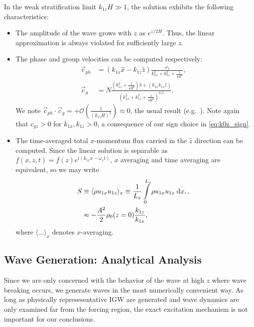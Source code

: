 \documentclass[
        fleqn,
        usenatbib,
    ]{mnras}
\newcommand*{\ev}[1]{\langle#1\rangle}
\newcommand*{\p}[1]{\left(#1\right)}
\begin{document}
In the weak stratification limit $k_{1z}H \gg 1$, the solution exhibits the
following characteristics:
\begin{itemize}
    \item The amplitude of the wave grows with $z$ as $e^{z/2H}$. Thus, the
        linear approximation is always violated for sufficiently large $z$.

    \item The phase and group velocities can be computed respectively:
        \begin{align}
            \vec{c}_{ph} &=
                \p{k_{1x}\hat{x} - k_{1z}\hat{z}}\frac{\omega_1}
                {k_{1x}^2 + k_{1z}^2 + \frac{1}{4H^2}},\\
            \vec{c}_{g} &= N\frac{\p{k_{1z}^2 + \frac{1}{4H^2}}\hat{x}
                + \p{k_{1x}k_{1z}\hat{z}}}
                {\p{k_{1x}^2 + k_{1z}^2 + \frac{1}{4H^2}}^{3/2}}.\label{eq:vg}
        \end{align}
        We note $\vec{c}_{ph} \cdot \vec{c}_g = +
        \mathcal{O}\p{\frac{1}{\p{k_{1z}H}^{2}}} \approx 0$, the usual result
        (e.g.\  \citep{drazin,sutherland1}). Note again that $c_{gz} > 0$ for
        $k_{1x}, k_{1z} > 0$, a consequence of our sign choice in
        \autoref{eq:k0z_sign}.

    \item The time-averaged total $x$-momentum flux carried in the $\hat{z}$
        direction can be computed. Since the linear solution is separable as
        $f(x, z, t) = f(z)e^{i(k_{1x}x - \omega_1 t)}$, $x$ averaging and time
        averaging are equivalent, so we may write
        \begin{align}
            S &\equiv \ev{\rho u_{1x} u_{1z}}_x \equiv
                \frac{1}{L_x}\int_0^{L_x}\limits \rho u_{1x} u_{1z}\;\mathrm{d}x,
                    \label{eq:S_def},\\
                &\approx -\frac{A^2}{2}\rho_0(z=0)\frac{k_{1z}}{k_{1x}},
                    \label{eq:S_lin}
        \end{align}
        where $\ev{\dots}_x$ denotes $x$-averaging.
\end{itemize}

\subsection{Wave Generation: Analytical Analysis}

Since we are only concerned with the behavior of the wave at high $z$ where wave
breaking occurs, we generate waves in the most numerically convenient way. As
long as physically represesentative IGW are generated and wave dynamics are only
examined far from the forcing region, the exact excitation mechanism is not
important for our conclusions.
\end{document}
